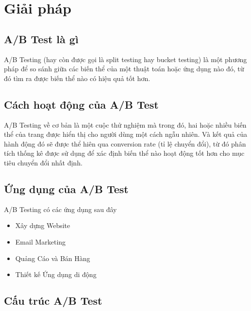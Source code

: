 \section{Giải pháp}

\subsection{A/B Test là gì}

\begin{frame}
	\alert{A/B Testing} (hay còn được gọi là split testing hay bucket testing) là một phương pháp để so sánh giữa các biến thể của một thuật toán hoặc ứng dụng nào đó, từ đó tìm ra được biến thể nào có hiệu quả tốt hơn.
\end{frame}

\subsection{Cách hoạt động của A/B Test}

\begin{frame}
	\alert{A/B Testing} về cơ bản là một cuộc thử nghiệm mà trong đó, hai hoặc nhiều biến thể của trang được hiển thị cho người dùng một cách ngẫu nhiên. Và kết quả của hành động đó sẽ được thể hiên qua conversion rate (tỉ lệ chuyển đổi), từ đó phân tích thống kê được sử dụng để xác định biến thể nào hoạt động tốt hơn cho mục tiêu chuyển đổi nhất định.
\end{frame}

\subsection{Ứng dụng của A/B Test}

\begin{frame}
	\alert{A/B Testing} có các ứng dụng sau đây
	\begin{itemize}
		\item Xây dựng Website
		\item Email Marketing
		\item Quảng Cáo và Bán Hàng
		\item Thiết kế Ứng dụng di động
	\end{itemize}
\end{frame}

\subsection{Cấu trúc A/B Test}

